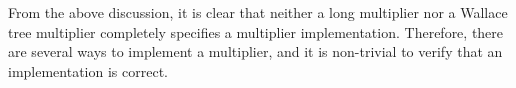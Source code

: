 From the above discussion, it is clear that neither a long multiplier
nor a Wallace tree multiplier completely specifies a multiplier implementation.
%
Therefore, there are several ways to implement a multiplier,
and it is non-trivial to verify that an implementation is correct.




